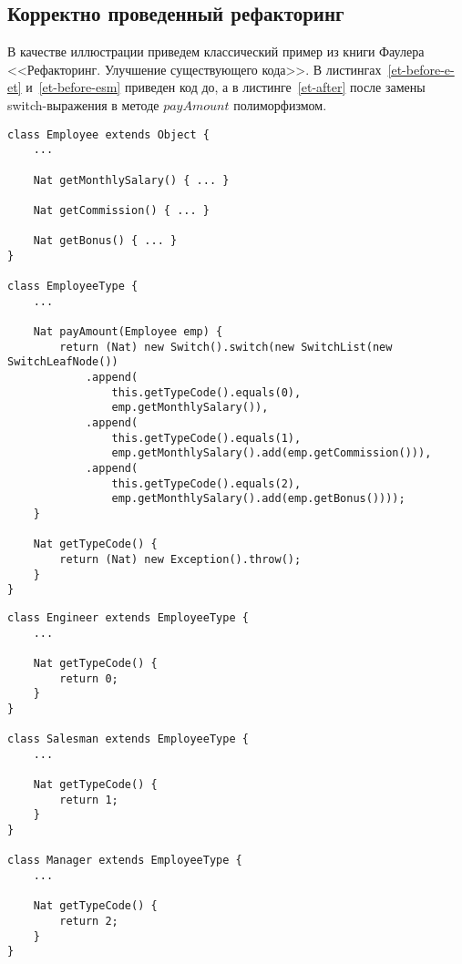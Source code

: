 \subsection{Корректно проведенный рефакторинг}
В качестве иллюстрации приведем классический пример из книги Фаулера <<Рефакторинг. Улучшение существующего кода>>.
В листингах~\ref{et-before-e-et} и~\ref{et-before-esm} приведен код до, а в листинге~\ref{et-after} после замены switch-выражения в методе $payAmount$ полиморфизмом.

\begin{lstlisting}[float,label=et-before-e-et,caption=Код до рефакторинга. Определение классов $Employee$ и $EmployeeType$.]
class Employee extends Object {
    ...

    Nat getMonthlySalary() { ... }

    Nat getCommission() { ... }

    Nat getBonus() { ... }
}

class EmployeeType {
    ...

    Nat payAmount(Employee emp) {
        return (Nat) new Switch().switch(new SwitchList(new SwitchLeafNode())
            .append(
                this.getTypeCode().equals(0),
                emp.getMonthlySalary()),
            .append(
                this.getTypeCode().equals(1), 
                emp.getMonthlySalary().add(emp.getCommission())),
            .append(
                this.getTypeCode().equals(2),
                emp.getMonthlySalary().add(emp.getBonus())));
    }

    Nat getTypeCode() {
        return (Nat) new Exception().throw();        
    }
}
\end{lstlisting}
\begin{lstlisting}[float,label=et-before-esm,caption=Код до рефакторинга. Определение наследников класса $EmployeeType$.]
class Engineer extends EmployeeType {
    ...

    Nat getTypeCode() {
        return 0;
    }
}

class Salesman extends EmployeeType {
    ...

    Nat getTypeCode() {
        return 1;
    }
}

class Manager extends EmployeeType {
    ...

    Nat getTypeCode() {
        return 2;
    }
}
\end{lstlisting}

